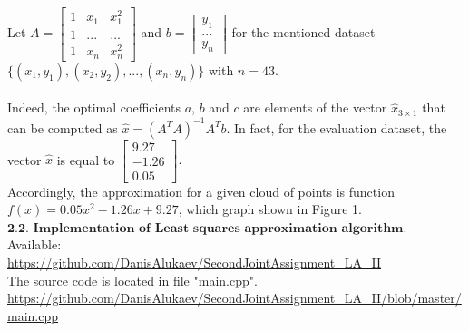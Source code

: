 \documentclass[11pt]{article}
\begin{document}
\noindent Let $A=\begin{bmatrix}
1 & x_{1} & x_{1}^{2}\\
1 & ... & ...\\
1 & x_{n} & x_{n}^{2}
\end{bmatrix}$ and                                       
$b=\begin{bmatrix}
y_{1}\\
...\\
y_{n}
\end{bmatrix}$ for the mentioned dataset \\ $\{ (x_{1},y_{1}), (x_{2},y_{2}), ...,(x_{n},y_{n}) \}$ with $n=43$. \\
\\
Indeed, the optimal coefficients $a$, $b$ and $c$ are elements of the vector $\hat{x}_{3\times1}$ that can be computed as $\hat{x}=(A^{T}A)^{-1}A^{T}b$.
In fact, for the evaluation dataset, the vector $\hat{x}$ is equal to $\begin{bmatrix}
9.27\\
-1.26\\
0.05
\end{bmatrix}.$\\ Accordingly, the approximation for a given cloud of points is function $f(x)=0.05x^{2}-1.26x+9.27$, which graph shown in Figure 1.
\bigbreak
\noindent $\textbf{2.2. Implementation of Least-squares approximation algorithm.}$\\
\noindent [Online] Available:\\
\url{https://github.com/DanisAlukaev/SecondJointAssignment_LA_II}\\
The source code is located in file "main.cpp".\\
\url{https://github.com/DanisAlukaev/SecondJointAssignment_LA_II/blob/master/main.cpp}\\
\end{document}
